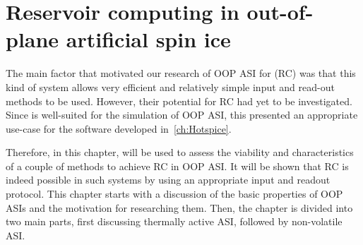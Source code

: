 \chapter{Reservoir computing in out-of-plane artificial spin ice}\label{ch:Applications}

The main factor that motivated our research of OOP ASI for  (RC) was that this kind of system allows very efficient and relatively simple input and read-out methods to be used.
However, their potential for RC had yet to be investigated.
Since \hotspice is well-suited for the simulation of OOP ASI, this presented an appropriate use-case for the software developed in~\cref{ch:Hotspice}. \par %
Therefore, in this chapter, \hotspice will be used to assess the viability and characteristics of a couple of methods to achieve RC in OOP ASI.
It will be shown that RC is indeed possible in such systems by using an appropriate input and readout protocol.
This chapter starts with a discussion of the basic properties of OOP ASIs and the motivation for researching them.
Then, the chapter is divided into two main parts, first discussing thermally active ASI, followed by non-volatile ASI.

